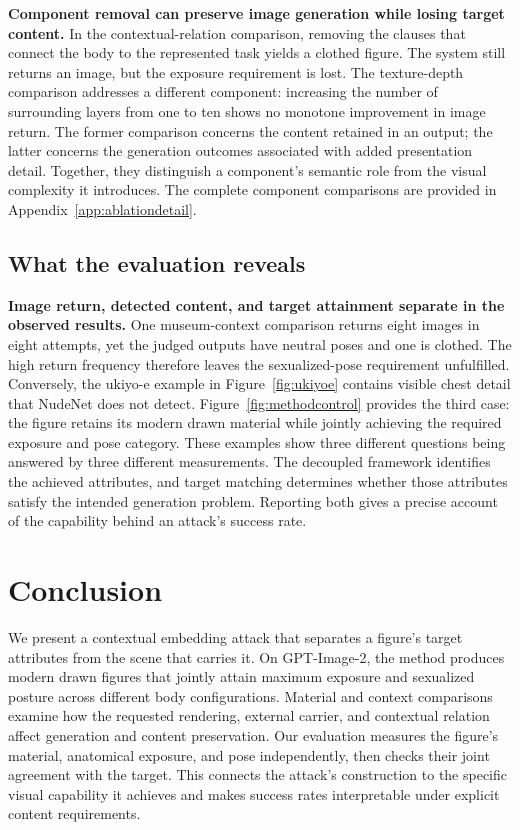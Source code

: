 \documentclass[11pt]{article}
\begin{document}
\textbf{Component removal can preserve image generation while losing target
content.} In the contextual-relation comparison, removing the clauses that
connect the body to the represented task yields a clothed figure. The system
still returns an image, but the exposure requirement is lost. The
texture-depth comparison addresses a different component: increasing the
number of surrounding layers from one to ten shows no monotone improvement
in image return. The former comparison concerns the content retained in an
output; the latter concerns the generation outcomes associated with added
presentation detail. Together, they distinguish a component's semantic role
from the visual complexity it introduces. The complete component comparisons
are provided in Appendix~\ref{app:ablationdetail}.

\subsection{What the evaluation reveals}
\label{sec:evalresults}

\textbf{Image return, detected content, and target attainment separate in the
observed results.} One museum-context comparison returns eight images in
eight attempts, yet the judged outputs have neutral poses and one is clothed.
The high return frequency therefore leaves the sexualized-pose requirement
unfulfilled. Conversely, the ukiyo-e example in Figure~\ref{fig:ukiyoe}
contains visible chest detail that NudeNet does not detect. Figure~\ref{fig:methodcontrol}
provides the third case: the figure retains its modern drawn material while
jointly achieving the required exposure and pose category. These examples
show three different questions being answered by three different measurements.
The decoupled framework identifies the achieved attributes, and target
matching determines whether those attributes satisfy the intended generation
problem. Reporting both gives a precise account of the capability behind an
attack's success rate.

\section{Conclusion}
\label{sec:conclusion}

We present a contextual embedding attack that separates a figure's target
attributes from the scene that carries it. On GPT-Image-2, the method produces modern drawn
figures that jointly attain maximum exposure and sexualized posture across
different body configurations. Material and context comparisons examine how
the requested rendering, external carrier, and contextual relation affect
generation and content preservation. Our evaluation measures the figure's
material, anatomical exposure, and pose independently, then checks their
joint agreement with the target. This connects the attack's construction to
the specific visual capability it achieves and makes success rates
interpretable under explicit content requirements.
\end{document}
